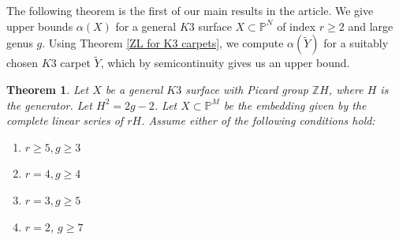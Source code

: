 \documentclass[11pt,twoside]{amsart}
\theoremstyle{plain}
\numberwithin{equation}{section}
\newtheorem{theorem}{Theorem}[section]
\theoremstyle{definition}
\begin{document}
The following theorem is the first of our main results in the article. We give upper bounds $\alpha(X)$ for a general $K3$ surface $X \subset \mathbb{P}^N$ of index $r \geq 2$ and large genus $g$. Using Theorem \ref{ZL for K3 carpets}, we compute $\alpha(\widetilde{Y})$ for a suitably chosen $K3$ carpet $\widetilde{Y}$, which by semicontinuity gives us an upper bound. 

\begin{theorem}\label{non-extendability of K3 surfaces}
    Let $X$ be a general $K3$ surface with Picard group $\mathbb{Z}H$, where $H$ is the generator. Let $H^2 = 2g-2$. Let $X \subset \mathbb{P}^M$ be the embedding given by the complete linear series of $rH$. Assume either of the following conditions hold:
    \begin{enumerate}
        \item[(1)] $r \geq 5, g \geq 3$
        \item[(2)] $r = 4, g \geq 4$
        \item[(3)] $r = 3, g \geq 5$ 
        \item[(4)] $r = 2$, $g \geq 7$ 
        
        
        
        
    \end{enumerate}
\end{theorem}
\end{document}
